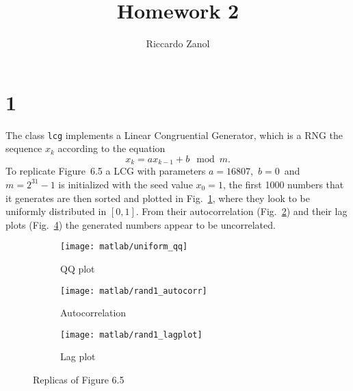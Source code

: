 \documentclass[a4paper,oneside]{article}
\author{Riccardo Zanol}
\title{Homework 2}
\newcommand{\inlinecode}[1]{\lstinline[basicstyle=\ttfamily,keywordstyle={},stringstyle={},commentstyle={\itshape}]{#1}}
\begin{document}
\maketitle
\section*{1}
The class \inlinecode{lcg} implements a Linear Congruential Generator,
which is a RNG the sequence $x_k$ according to the equation
\[ x_{k} = ax_{k-1} +b \mod m . \]
To replicate Figure~6.5 a LCG with parameters
$a=16807$,~$b=0$~and~$m=2^{31}-1$ is initialized with the seed value
$x_0 = 1$, the first 1000 numbers that it generates are then sorted
and plotted in Fig.~\ref{plot:qqplot}, where they look to be uniformly
distributed in $[0,1]$.  From their autocorrelation
(Fig.~\ref{plot:autocorr}) and their lag plots
(Fig.~\ref{plot:lagplot}) the generated numbers appear to be
uncorrelated.
\begin{figure}[htbp]
  \centering
  \begin{subfigure}{0.5\textwidth}
    \centering
    \texttt{[image: matlab/uniform\_qq]}
    \caption{QQ plot}
    \label{plot:qqplot}
  \end{subfigure}%
  \begin{subfigure}{0.5\textwidth}
        \centering
    \texttt{[image: matlab/rand1\_autocorr]}
    \caption{Autocorrelation}
    \label{plot:autocorr}
  \end{subfigure}
  \begin{subfigure}{0.5\textwidth}
        \centering
    \texttt{[image: matlab/rand1\_lagplot]}
    \caption{Lag plot}
    \label{plot:lagplot}
  \end{subfigure}
  \caption{Replicas of Figure 6.5}
\end{figure}
\end{document}
